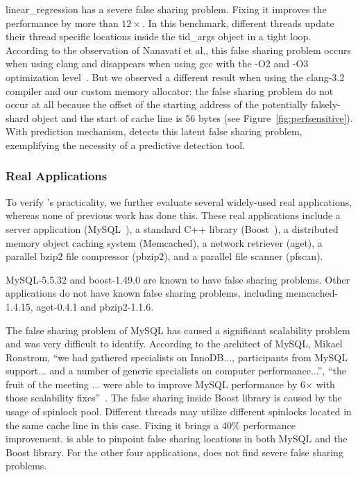 linear\_regression has a severe false sharing problem. Fixing it improves the performance by more than $12\times$. In this benchmark, different threads update their thread specific locations inside the tid\_args object in a tight loop. According to the observation of Nanavati et al., this false sharing problem occurs when using clang and disappears when using gcc with the -O2 and -O3 optimization level~\cite{OSdetection}. But we observed a different result when using the clang-3.2 compiler and our custom memory allocator: the false sharing problem do not occur at all because the offset of the starting address of the potentially falsely-shard object and the start of cache line is 56 bytes (see Figure~\ref{fig:perfsensitive}). With prediction mechanism, \Predator{} detects this latent false sharing problem, exemplifying the necessity of a predictive detection tool. 

\subsubsection{Real Applications}
To verify \Predator{}'s practicality, we further evaluate several widely-used real applications, whereas none of previous work has done this. These real applications include a server application (MySQL~\cite{mysql}),
a standard C++ library (Boost~\cite{libfalsesharing}),
a distributed memory object caching system (Memcached), a network retriever (aget),
a parallel bzip2 file compressor (pbzip2), and a parallel file scanner (pfscan).

MySQL-5.5.32 and boost-1.49.0 are known to have false sharing problems. Other applications do not have known false sharing problems, including memcached-1.4.15, aget-0.4.1 and pbzip2-1.1.6.

The false sharing problem of MySQL has caused a significant scalability problem and was very difficult to identify.
According to the architect of MySQL, Mikael Ronstrom, ``we had gathered specialists on InnoDB..., participants from MySQL support... and a number of generic specialists on 
computer performance...'', ``the fruit of the meeting ... were able to improve MySQL performance by 6$\times$ with those scalability fixes''~\cite{mysql}. 
The false sharing inside Boost library is caused by the usage of spinlock pool. Different threads may utilize different spinlocks located in the same cache line in this case. Fixing it brings a 40\% performance improvement.
\Predator{} is able to pinpoint false sharing locations in both MySQL and the Boost library. 
For the other four applications, \Predator{} does not find severe false sharing problems.

